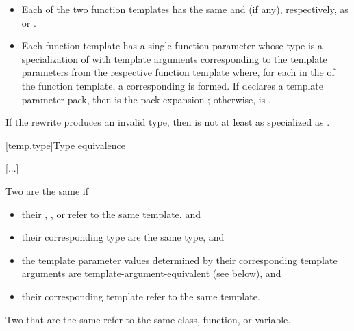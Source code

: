 \documentclass{wg21}
\begin{document}
\begin{itemize}
\item
Each of the two function templates has the same 
and  (if any),
respectively, as  or .
\item
Each function template has a single function parameter
whose type is a specialization of 
with template arguments corresponding to the template parameters
from the respective function template where,
for each  
in the  of the function template,
a corresponding   is formed.
If  declares a template parameter pack,
then  is the pack expansion ;
otherwise,  is    .
\end{itemize}
If the rewrite produces an invalid type,
then  is not at least as specialized as .

[temp.type]{Type equivalence}

\textcolor{noteclr}{[...]}

\pnum
{}%
Two  are the same if
\begin{itemize}
    \item
    their ,
    , or
    refer to the same template, and

    \item
    their corresponding type 
    are the same type, and

    \item
    the template parameter values determined by
    their corresponding  template arguments
    are template-argument-equivalent (see below), and

    \item
    their corresponding template 
    refer to the same template.
\end{itemize}

Two  that are the same
refer to the same class, function, or variable.
\end{document}
